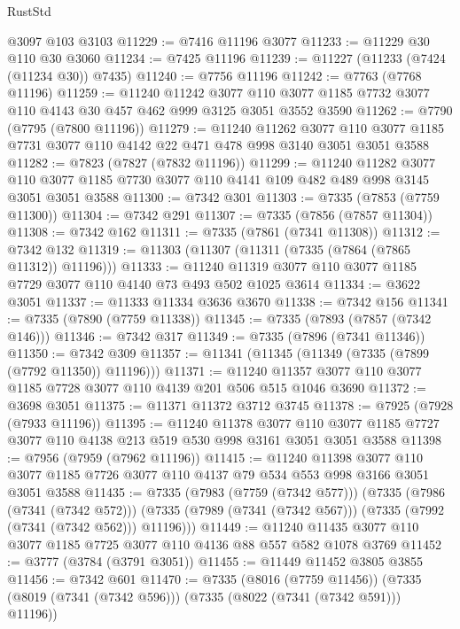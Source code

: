 \begin{lexlean}{RustStd}
\begin{coremodule}
    @3097
    @103
    @3103
@11229 := @7416 @11196 @3077
@11233 := @11229 @30 @110 @30 @3060
@11234 := @7425 @11196
@11239 := @11227 (@11233 (@7424 (@11234 @30)) @7435)
@11240 := @7756 @11196
@11242 := @7763 (@7768 @11196)
@11259 := @11240
    @11242
    @3077
    @110
    @3077
    @1185
    @7732
    @3077
    @110
    @4143
    @30
    @457
    @462
    @999
    @3125
    @3051
    @3552
    @3590
@11262 := @7790 (@7795 (@7800 @11196))
@11279 := @11240
    @11262
    @3077
    @110
    @3077
    @1185
    @7731
    @3077
    @110
    @4142
    @22
    @471
    @478
    @998
    @3140
    @3051
    @3051
    @3588
@11282 := @7823 (@7827 (@7832 @11196))
@11299 := @11240
    @11282
    @3077
    @110
    @3077
    @1185
    @7730
    @3077
    @110
    @4141
    @109
    @482
    @489
    @998
    @3145
    @3051
    @3051
    @3588
@11300 := @7342 @301
@11303 := @7335 (@7853 (@7759 @11300))
@11304 := @7342 @291
@11307 := @7335 (@7856 (@7857 @11304))
@11308 := @7342 @162
@11311 := @7335 (@7861 (@7341 @11308))
@11312 := @7342 @132
@11319 := @11303 (@11307 (@11311 (@7335 (@7864 (@7865 @11312)) @11196)))
@11333 := @11240 @11319 @3077 @110 @3077 @1185 @7729 @3077 @110 @4140 @73 @493 @502 @1025 @3614
@11334 := @3622 @3051
@11337 := @11333 @11334 @3636 @3670
@11338 := @7342 @156
@11341 := @7335 (@7890 (@7759 @11338))
@11345 := @7335 (@7893 (@7857 (@7342 @146)))
@11346 := @7342 @317
@11349 := @7335 (@7896 (@7341 @11346))
@11350 := @7342 @309
@11357 := @11341 (@11345 (@11349 (@7335 (@7899 (@7792 @11350)) @11196)))
@11371 := @11240 @11357 @3077 @110 @3077 @1185 @7728 @3077 @110 @4139 @201 @506 @515 @1046 @3690
@11372 := @3698 @3051
@11375 := @11371 @11372 @3712 @3745
@11378 := @7925 (@7928 (@7933 @11196))
@11395 := @11240
    @11378
    @3077
    @110
    @3077
    @1185
    @7727
    @3077
    @110
    @4138
    @213
    @519
    @530
    @998
    @3161
    @3051
    @3051
    @3588
@11398 := @7956 (@7959 (@7962 @11196))
@11415 := @11240
    @11398
    @3077
    @110
    @3077
    @1185
    @7726
    @3077
    @110
    @4137
    @79
    @534
    @553
    @998
    @3166
    @3051
    @3051
    @3588
@11435 := @7335
    (@7983 (@7759 (@7342 @577)))
    (@7335
      (@7986 (@7341 (@7342 @572)))
      (@7335 (@7989 (@7341 (@7342 @567))) (@7335 (@7992 (@7341 (@7342 @562))) @11196)))
@11449 := @11240 @11435 @3077 @110 @3077 @1185 @7725 @3077 @110 @4136 @88 @557 @582 @1078 @3769
@11452 := @3777 (@3784 (@3791 @3051))
@11455 := @11449 @11452 @3805 @3855
@11456 := @7342 @601
@11470 := @7335
    (@8016 (@7759 @11456))
    (@7335 (@8019 (@7341 (@7342 @596))) (@7335 (@8022 (@7341 (@7342 @591))) @11196))

\end{coremodule}
\end{lexlean}
